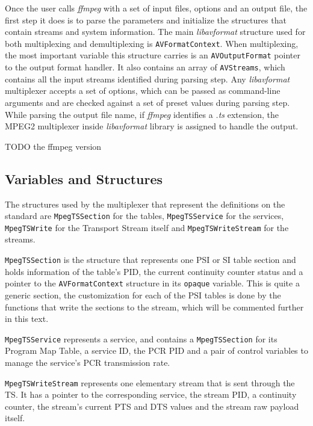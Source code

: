 \documentclass[
	12pt,				%
	openright,			%
	twoside,			%
	a4paper,			%
	brazil,
	french,				%
	english
	]{abntex2}
\begin{document}
Once the user calls \textit{ffmpeg} with a set of input files, options and an output file, the first step it does is to parse the parameters and initialize the structures that contain streams and system information. The main \textit{libavformat} structure used for both multiplexing and demultiplexing is \texttt{AVFormatContext}. When multiplexing, the most important variable this structure carries is an \texttt{AVOutputFormat} pointer to the output format handler. It also contains an array of \texttt{AVStreams}, which contains all the input streams identified during parsing step. Any \textit{libavformat} multiplexer accepts a set of options, which can be passed as command-line arguments and are checked against a set of preset values during parsing step. While parsing the output file name, if \textit{ffmpeg} identifies a \textit{.ts} extension, the MPEG2 multiplexer inside \textit{libavformat} library is assigned to handle the output.

TODO the ffmpeg version

\subsection{Variables and Structures}

The structures used by the multiplexer that represent the definitions on the standard are \texttt{MpegTSSection} for the tables, \texttt{MpegTSService} for the services, \texttt{MpegTSWrite} for the Transport Stream itself and \texttt{MpegTSWriteStream} for the streams.

\texttt{MpegTSSection} is the structure that represents one PSI or SI table section and holds information of the table's PID, the current continuity counter status and a pointer to the \texttt{AVFormatContext} structure in its \texttt{opaque} variable. This is quite a generic section, the customization for each of the PSI tables is done by the functions that write the sections to the stream, which will be commented further in this text.

\texttt{MpegTSService} represents a service, and contains a \texttt{MpegTSSection} for its Program Map Table, a service ID, the PCR PID and a pair of control variables to manage the service's PCR transmission rate.

\texttt{MpegTSWriteStream} represents one elementary stream that is sent through the TS. It has a pointer to the corresponding service, the stream PID, a continuity counter, the stream's current PTS and DTS values and the stream raw payload itself.
\end{document}
